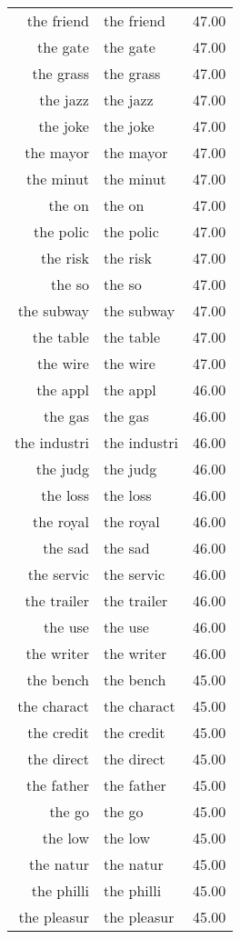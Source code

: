 \begin{table}[ht]
\begin{tabular}{rlr}
  the friend & the friend & 47.00 \\ 
  the gate & the gate & 47.00 \\ 
  the grass & the grass & 47.00 \\ 
  the jazz & the jazz & 47.00 \\ 
  the joke & the joke & 47.00 \\ 
  the mayor & the mayor & 47.00 \\ 
  the minut & the minut & 47.00 \\ 
  the on & the on & 47.00 \\ 
  the polic & the polic & 47.00 \\ 
  the risk & the risk & 47.00 \\ 
  the so & the so & 47.00 \\ 
  the subway & the subway & 47.00 \\ 
  the table & the table & 47.00 \\ 
  the wire & the wire & 47.00 \\ 
  the appl & the appl & 46.00 \\ 
  the gas & the gas & 46.00 \\ 
  the industri & the industri & 46.00 \\ 
  the judg & the judg & 46.00 \\ 
  the loss & the loss & 46.00 \\ 
  the royal & the royal & 46.00 \\ 
  the sad & the sad & 46.00 \\ 
  the servic & the servic & 46.00 \\ 
  the trailer & the trailer & 46.00 \\ 
  the use & the use & 46.00 \\ 
  the writer & the writer & 46.00 \\ 
  the bench & the bench & 45.00 \\ 
  the charact & the charact & 45.00 \\ 
  the credit & the credit & 45.00 \\ 
  the direct & the direct & 45.00 \\ 
  the father & the father & 45.00 \\ 
  the go & the go & 45.00 \\ 
  the low & the low & 45.00 \\ 
  the natur & the natur & 45.00 \\ 
  the philli & the philli & 45.00 \\ 
  the pleasur & the pleasur & 45.00 \\ 

\end{tabular}
\end{table}
